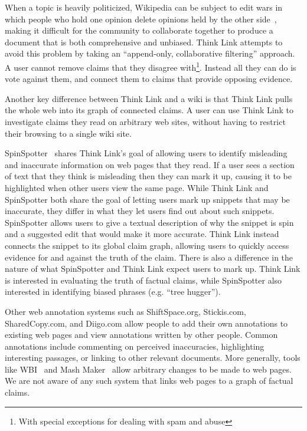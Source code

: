 \documentclass{chi2009}
\begin{document}
When a topic is heavily politicized, Wikipedia can be subject to edit wars in which people who hold one opinion delete opinions held by the other side~\cite{wikicorrect3}, making it difficult for the community to collaborate together to produce a document that is both comprehensive and unbiased. Think Link attempts to avoid this problem by taking an ``append-only, collaborative filtering'' approach. A user cannot remove claims that they disagree with\footnote{With special exceptions for dealing with spam and abuse}. Instead all they can do is vote against them, and connect them to claims that provide opposing evidence.

Another key difference between Think Link and a wiki is that Think Link pulls the whole web into its graph of connected claims. A user can use Think Link to investigate claims they read on arbitrary web sites, without having to restrict their browsing to a single wiki site.

SpinSpotter~\cite{spinspotter} shares Think Link's goal of allowing users to identify misleading and inaccurate information on web pages that they read. If a user sees a section of text that they think is misleading then they can mark it up, causing it to be highlighted when other users view the same page. While Think Link and SpinSpotter both share the goal of letting users mark up snippets that may be inaccurate, they differ in what they let users find out about such snippets. SpinSpotter allows users to give a textual description of why the snippet is spin and a suggested edit that would make it more accurate. Think Link instead connects the snippet to its global claim graph, allowing users to quickly access evidence for and against the truth of the claim. There is also a difference in the nature of what SpinSpotter and Think Link expect users to mark up. Think Link is interested in evaluating the truth of factual claims, while SpinSpotter also interested in identifying biased phrases (e.g. ``tree hugger'').

Other web annotation systems such as ShiftSpace.org, Stickis.com, SharedCopy.com, and Diigo.com allow people to add their own annotations to existing web pages and view annotations written by other people. Common annotations include commenting on perceived inaccuracies, highlighting interesting passages, or linking to other relevant documents. More generally, tools like WBI~\cite{personalweb} and Mash Maker~\cite{mashmaker} allow arbitrary changes to be made to web pages. We are not aware of any such system that links web pages to a graph of factual claims. 
\end{document}
